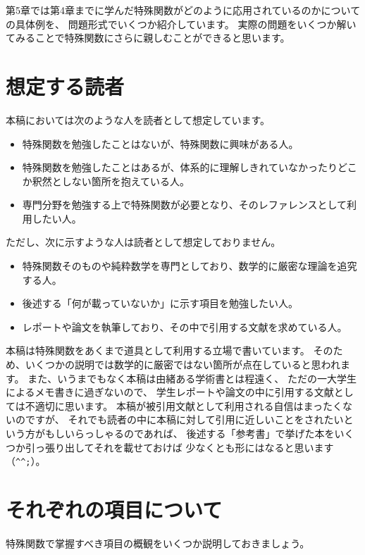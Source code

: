 \documentclass[../main/main]{subfiles}
\begin{document}
第5章では第4章までに学んだ特殊関数がどのように応用されているのかについての具体例を、
問題形式でいくつか紹介しています。
実際の問題をいくつか解いてみることで特殊関数にさらに親しむことができると思います。




\section*{想定する読者}
本稿においては次のような人を読者として想定しています。 \vspace{3pt}
\begin{itemize}
  \item 特殊関数を勉強したことはないが、特殊関数に興味がある人。
  \item 特殊関数を勉強したことはあるが、体系的に理解しきれていなかったりどこか釈然としない箇所を抱えている人。
  \item 専門分野を勉強する上で特殊関数が必要となり、そのレファレンスとして利用したい人。
\end{itemize}\vspace{12pt}
ただし、次に示すような人は読者として想定しておりません。 \vspace{3pt}
\begin{itemize}
  \item 特殊関数そのものや純粋数学を専門としており、数学的に厳密な理論を追究する人。
  \item 後述する「何が載っていないか」に示す項目を勉強したい人。
  \item レポートや論文を執筆しており、その中で引用する文献を求めている人。
\end{itemize}\vspace{3pt}
本稿は特殊関数をあくまで道具として利用する立場で書いています。
そのため、いくつかの説明では数学的に厳密ではない箇所が点在していると思われます。
また、いうまでもなく本稿は由緒ある学術書とは程遠く、
ただの一大学生によるメモ書きに過ぎないので、
学生レポートや論文の中に引用する文献としては不適切に思います。
本稿が被引用文献として利用される自信はまったくないのですが、
それでも読者の中に本稿に対して引用に近しいことをされたいという方がもしいらっしゃるのであれば、
後述する「参考書」で挙げた本をいくつか引っ張り出してそれを載せておけば
少なくとも形にはなると思います（\verb|^^;|）。



\section*{それぞれの項目について}
特殊関数で掌握すべき項目の概観をいくつか説明しておきましょう。
\end{document}
